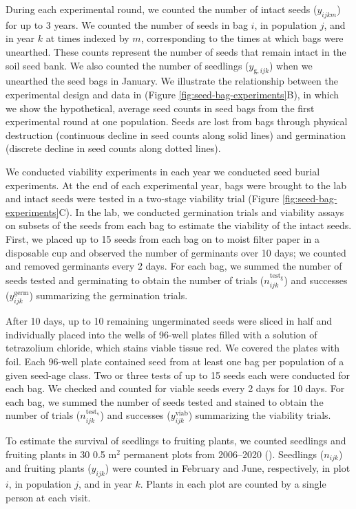 \documentclass[12pt, oneside]{article}   	%
\begin{document}
During each experimental round, we counted the number of intact seeds ($y_{ijkm}$) for up to 3 years. We counted the number of seeds in bag $i$, in population $j$, and in year $k$ at times indexed by $m$, corresponding to the times at which bags were unearthed. These counts represent the number of seeds that remain intact in the soil seed bank. We also counted the number of seedlings ($y_{\mathrm{g},ijk}$) when we unearthed the seed bags in January. We illustrate the relationship between the experimental design and data in (Figure \ref{fig:seed-bag-experiments}B), in which we show the hypothetical, average seed counts in seed bags from the first experimental round at one population. Seeds are lost from bags through physical destruction (continuous decline in seed counts along solid lines) and germination (discrete decline in seed counts along dotted lines). 

We conducted viability experiments in each year we conducted seed burial experiments. At the end of each experimental year, bags were brought to the lab and intact seeds were tested in a two-stage viability trial (Figure \ref{fig:seed-bag-experiments}C). In the lab, we conducted germination trials and viability assays on subsets of the seeds from each bag to estimate the viability of the intact seeds. First, we placed up to 15 seeds from each bag on to moist filter paper in a disposable cup and observed the number of germinants over 10 days; we counted and removed germinants every 2 days. For each bag, we summed the number of seeds tested and germinating to obtain the number of trials ($n^\mathrm{test_g}_{ijk}$) and successes ($y^{\mathrm{germ}}_{ijk}$) summarizing the germination trials. 

After 10 days, up to 10 remaining ungerminated seeds were sliced in half and individually placed into the wells of 96-well plates filled with a solution of tetrazolium chloride, which stains viable tissue red. We covered the plates with foil. Each 96-well plate contained seed from at least one bag per population of a given seed-age class. Two or three tests of up to 15 seeds each were conducted for each bag. We checked and counted for viable seeds  every 2 days for 10 days. For each bag, we summed the number of seeds tested and stained to obtain the number of trials ($n^\mathrm{test_v}_{ijk}$) and successes ($y^{\mathrm{viab}}_{ijk}$) summarizing the viability trials. 

To estimate the survival of seedlings to fruiting plants, we counted seedlings and fruiting plants in 30 0.5 m$^2$ permanent plots from 2006--2020 (\cite{eckhart2011}). Seedlings ($n_{ijk}$) and fruiting plants ($y_{ijk}$) were counted in February and June, respectively, in plot $i$, in population $j$, and in year $k$. Plants in each plot are counted by a single person at each visit. 
\end{document}
